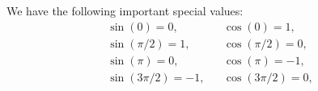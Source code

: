 \begin{proposition}\label{thm:trigonometric_function_basic_roots}
  We have the following important special values:
  \begin{align}
    \sin(0) = 0,                && \cos(0) = 1,               \label{eq:thm:trigonometric_function_basic_roots/zero} \\
    \sin(\pi / 2) = 1,     && \cos(\pi / 2) = 0,    \label{eq:thm:trigonometric_function_basic_roots/half_pi} \\
    \sin(\pi) = 0,              && \cos(\pi) = -1,            \label{eq:thm:trigonometric_function_basic_roots/pi} \\
    \sin(3\pi / 2) = -1, && \cos(3\pi / 2) = 0, \label{eq:thm:trigonometric_function_basic_roots/sesqui_pi}
  \end{align}
\end{proposition}
